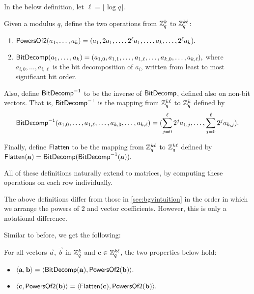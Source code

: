     In the below definition, let $\ell = \lfloor \log q \rfloor$.

    \begin{definition}
        Given a modulus $q$, define the two operations from $\Z_q^k$ to $\Z_q^{k \ell}$:
        \begin{enumerate}
            \item ${\sf PowersOf2}(a_1, \dots, a_k) = (a_1, 2 a_1, \dots, 2^{\ell} a_1, \dots, a_k, \dots, 2^{\ell} a_k).$
            \item ${\sf BitDecomp}(a_1, \dots, a_k) = (a_{1, 0}, a_{1, 1}, \dots, a_{1, \ell}, \dots, a_{k, 0}, \dots, a_{k, \ell}),$ where $a_{i, 0}, \dots, a_{i, \ell}$ is the bit decomposition of $a_i$, written from least to most significant bit order.
        \end{enumerate}

        Also, define ${\sf BitDecomp}\inv$ to be the inverse of ${\sf BitDecomp}$, defined also on non-bit vectors. That is, ${\sf BitDecomp}\inv$ is the mapping from $\Z_q^{k \ell}$ to $\Z_q^k$ defined by
        \[{\sf BitDecomp}\inv(a_{1, 0}, \dots, a_{1, \ell}, \dots, a_{k, 0}, \dots, a_{k, \ell}) = (\sum_{j = 0}^\ell 2^j a_{1, j}, \dots, \sum_{j = 0}^\ell 2^j a_{k, j}).\]


        Finally, define ${\sf Flatten}$ to be the mapping from $\Z_q^{k \ell}$ to $\Z_q^{k \ell}$ defined by ${\sf Flatten}(\vec{a}) = {\sf BitDecomp}({\sf BitDecomp}\inv(\vec{a})).$

        All of these definitions naturally extend to matrices, by computing these operations on each row individually.
    \end{definition}

    The above definitions differ from those in \ref{sec:bgvintuition} in the order in which we arrange the powers of $2$ and vector coefficients. However, this is only a notational difference.

    Similar to before, we get the following:

    \begin{lemma} \label{lem:flatten}
        For all vectors $\vec{a}$, $\vec{b}$ in $\Z_q^k$ and $\vec{c} \in \Z_q^{k \ell}$, the two properties below hold:
        \begin{itemize}
            \item $\langle \vec{a}, \vec{b} \rangle = \langle {\sf BitDecomp}(\vec{a}), {\sf PowersOf2}(\vec{b}) \rangle.$
            \item $\langle \vec{c}, {\sf PowersOf2}(\vec{b}) \rangle = \langle {\sf Flatten}(\vec{c}), {\sf PowersOf2}(\vec{b}) \rangle.$
        \end{itemize}
    \end{lemma}


